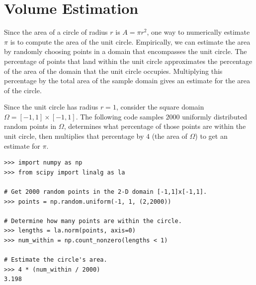 

\section*{Volume Estimation} %

Since the area of a circle of radius $r$ is $A = \pi r^2$, one way to numerically estimate $\pi$ is to compute the area of the unit circle.
Empirically, we can estimate the area by randomly choosing points in a domain that encompasses the unit circle.
The percentage of points that land within the unit circle approximates the percentage of the area of the domain that the unit circle occupies.
Multiplying this percentage by the total area of the sample domain gives an estimate for the area of the circle.

Since the unit circle has radius $r=1$, consider the square domain $\Omega=[-1,1]\times[-1,1]$.
The following code samples $2000$ uniformly distributed random points in $\Omega$, determines what percentage of those points are within the unit circle, then multiplies that percentage by $4$ (the area of $\Omega$) to get an estimate for $\pi$.

\begin{lstlisting}
>>> import numpy as np
>>> from scipy import linalg as la

# Get 2000 random points in the 2-D domain [-1,1]x[-1,1].
>>> points = np.random.uniform(-1, 1, (2,2000))

# Determine how many points are within the circle.
>>> lengths = la.norm(points, axis=0)
>>> num_within = np.count_nonzero(lengths < 1)

# Estimate the circle's area.
>>> 4 * (num_within / 2000)
3.198
\end{lstlisting}


